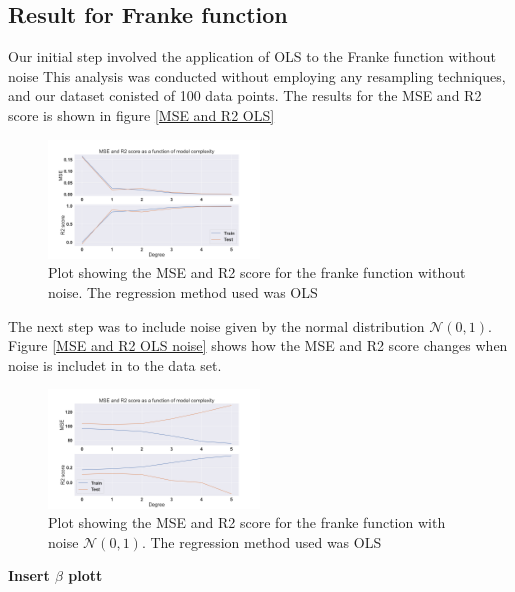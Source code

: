 \thispagestyle{plain}
\subsection{Result for Franke function}
\noindent Our initial step involved the application of OLS to the Franke function without noise
This analysis was conducted without employing any resampling techniques, 
and our dataset conisted of 100 data points. The results for the MSE and R2 score is shown in 
figure \eqref{MSE and R2 OLS}

\begin{figure}[h]
	\centering
	\includegraphics[width=0.5\textwidth]{Figure_3.png}
	\caption{Plot showing the MSE and R2 score for the franke function without noise. The regression method used was OLS}
	\label{MSE and R2 OLS}
\end{figure}
\noindent The next step was to include noise given by the normal distribution $\mathcal{N}(0,1)$. Figure \eqref{MSE and R2 OLS noise} shows
how the MSE and R2 score changes when noise is includet in to the data set.
\begin{figure}[h]
	\centering
	\includegraphics[width=0.5\textwidth]{Figure_4.png}
	\caption{Plot showing the MSE and R2 score for the franke function with noise $\mathcal{N}(0,1)$. The regression method used was OLS}
	\label{MSE and R2 OLS noise}
\end{figure}
\newline \newline
\textbf{Insert $\beta$ plott}
\newline \newline

